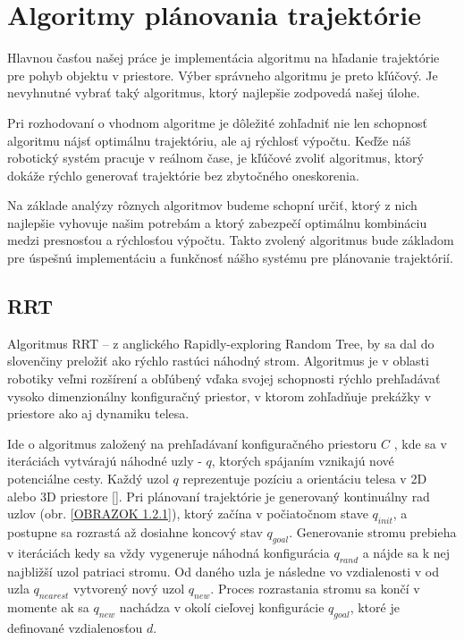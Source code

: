 \section{Algoritmy plánovania trajektórie}
\label{kap:2}
Hlavnou časťou našej práce je implementácia algoritmu na hľadanie trajektórie pre pohyb objektu v priestore. Výber správneho algoritmu je preto kľúčový. Je nevyhnutné vybrať taký algoritmus, ktorý najlepšie zodpovedá našej úlohe.

Pri rozhodovaní o vhodnom algoritme je dôležité zohľadniť nie len schopnosť algoritmu nájsť optimálnu trajektóriu, ale aj rýchlosť výpočtu. Keďže náš robotický systém pracuje v reálnom čase, je kľúčové zvoliť algoritmus, ktorý dokáže rýchlo generovať trajektórie bez zbytočného oneskorenia.

Na základe analýzy rôznych algoritmov budeme schopní určiť, ktorý z nich najlepšie vyhovuje našim potrebám a ktorý zabezpečí optimálnu kombináciu medzi presnosťou a rýchlosťou výpočtu. Takto zvolený algoritmus bude základom pre úspešnú implementáciu a funkčnosť nášho systému pre plánovanie trajektórií.
 
\subsection{RRT}
\label{kap:2.1}

Algoritmus RRT – z anglického Rapidly-exploring Random Tree, by sa dal do slovenčiny preložiť ako rýchlo rastúci náhodný strom. Algoritmus je v oblasti robotiky veľmi rozšírení a obľúbený vďaka svojej schopnosti rýchlo prehľadávať vysoko dimenzionálny konfiguračný priestor, v ktorom zohľadňuje prekážky v priestore ako aj dynamiku telesa. \newline

Ide o algoritmus založený na prehľadávaní konfiguračného priestoru $C$ , kde sa v iteráciách vytvárajú náhodné uzly - $q$, ktorých spájaním vznikajú nové potenciálne cesty. Každý uzol $q$ reprezentuje pozíciu a orientáciu telesa v 2D alebo 3D priestore []. Pri plánovaní trajektórie je generovaný kontinuálny rad uzlov (obr. \ref{OBRAZOK 1.2.1}), ktorý začína v počiatočnom stave $q_{init}$,  a postupne sa rozrastá až dosiahne koncový stav $q_{goal}$.  Generovanie stromu prebieha v iteráciách kedy sa vždy vygeneruje náhodná konfigurácia $q_{rand}$ a nájde sa k nej najbližší uzol patriaci stromu. Od daného uzla je následne vo vzdialenosti v od uzla $q_{nearest}$ vytvorený nový uzol $q_{new}$. Proces rozrastania stromu sa končí v momente ak sa $q_{new}$  nachádza v okolí cieľovej konfigurácie $q_{goal}$, ktoré je definované vzdialenosťou $d$. 


